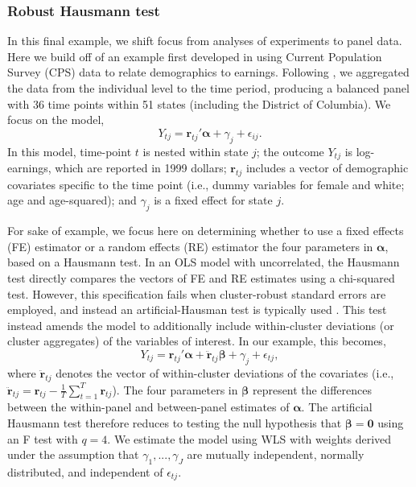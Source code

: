 \documentclass[12pt]{article}
\newcommand{\bm}{\mathbf}
\newcommand{\bs}{\boldsymbol}
\begin{document}
\subsubsection{Robust Hausmann test} 

In this final example, we shift focus from analyses of experiments to panel data. Here we build off of an example first developed in \citet{Bertrand2004how} using Current Population Survey (CPS) data to relate demographics to earnings. Following \citet{Cameron2015practitioners}, we aggregated the data from the individual level to the time period, producing a balanced panel with 36 time points within 51 states (including the District of Columbia). We focus on the model,
\begin{equation}
Y_{tj} = \bm{r}_{tj}'\bs\alpha + \gamma_j + \epsilon_{ij}.
\end{equation}
In this model, time-point $t$ is nested within state $j$; the outcome $Y_{tj}$ is log-earnings, which are reported in 1999 dollars; $\bm{r}_{tj}$ includes a vector of demographic covariates specific to the time point (i.e., dummy variables for female and white; age and age-squared); and $\gamma_j$ is a fixed effect for state $j$. 

For sake of example, we focus here on determining whether to use a fixed effects (FE) estimator or a random effects (RE) estimator the four parameters in $\bs\alpha$, based on a Hausmann test. In an OLS model with uncorrelated, the Hausmann test directly compares the vectors of FE and RE estimates using a chi-squared test. However, this specification fails when cluster-robust standard errors are employed, and instead an artificial-Hausman test \citep{Arellano1993on} is typically used \citep[pp. 290-291]{Wooldridge2002econometric}. This test instead amends the model to additionally include within-cluster deviations (or cluster aggregates) of the variables of interest. In our example, this becomes,
\begin{equation}
Y_{tj} = \bm{r}_{tj}'\bs\alpha + \bm{\ddot{r}}_{tj}\bs\beta + \gamma_j + \epsilon_{tj},
\end{equation}
where $\bm{\ddot{r}}_{tj}$ denotes the vector of within-cluster deviations of the covariates (i.e., $\bm{\ddot{r}}_{tj} = \bm{r}_{tj} - \frac{1}{T}\sum_{t=1}^T \bm{r}_{tj}$).
The four parameters in $\bs\beta$ represent the differences between the within-panel and between-panel estimates of $\bs\alpha$. The artificial Hausmann test therefore reduces to testing the null hypothesis that $\bs\beta = \bm{0}$ using an F test with $q = 4$. We estimate the model using WLS with weights derived under the assumption that  $\gamma_1,...,\gamma_J$ are mutually independent, normally distributed, and independent of $\epsilon_{tj}$.
\end{document}
